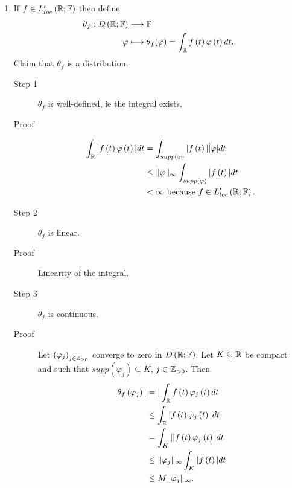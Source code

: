 \begin{example}
\begin{enumerate}
	\item If $f \in  L'_{loc}\left( \mathbb{R}; \mathbb{F} \right) $ then define 
		\begin{align*}
			\theta_{f}: D\left( \mathbb{R};\mathbb{F} \right)  &\longrightarrow \mathbb{F} \\
			\varphi &\longmapsto \theta_{f}(\varphi) = \int_{\mathbb{R}}^{ } f\left( t \right) \varphi\left( t \right) dt 
		.\end{align*}
		Claim that $\theta_{f}$ is a distribution. 
		\begin{description}
			\item[Step 1] $\theta _{f}$ is well-defined, ie the integral exists. 
			\item[Proof] 
				\begin{align*}
					\int_{\mathbb{R}} |f\left( t \right) \varphi\left( t \right) | dt &= \int_{supp\left( \varphi \right) }^{ } |f\left( t \right) | \dot | \varphi | dt  \\
												  &\le \|\varphi\|_{\infty} \int_{supp\left( \varphi \right) }^{ } |f\left( t \right) | dt \\
												  &< \infty\text{ because }f \in  L'_{loc} \left( \mathbb{R}; \mathbb{F} \right) 
				.\end{align*}
			\item[Step 2] $\theta _{f}$ is linear. 
			\item[Proof] Linearity of the integral. 
			\item[Step 3] $\theta _{f}$ is continuous. 
			\item[Proof] Let $\left( \varphi_{j} \right) _{j \in  \mathbb{Z}_{>0}}$ converge to zero in $D\left( \mathbb{R}; \mathbb{F} \right) $. Let $K \subseteq \mathbb{R}$ be compact and such that $supp\left( \varphi_{j} \right) \subseteq K$, $j \in  \mathbb{Z}_{>0}$. Then 
				\begin{align*}
					|\theta_{f}\left( \varphi_{j} \right) | &=  |\int_{\mathbb{R}}^{ } f\left( t \right) \varphi_{j}\left( t \right)  dt  \\
										&\le  \int_{\mathbb{R}}^{ } |f\left( t \right) \varphi_{j} \left( t \right)  | dt \\
										&= \int_{K}^{ } |  |f\left( t \right) \varphi_{j} \left( t \right)  | dt \\
										&\le \|\varphi_{j}\|_{\infty} \int_{K}^{ } |f\left( t \right) | dt\\
										&\le M\|\varphi_{j}\|_{\infty}
				.\end{align*}
		\end{description}

\end{enumerate}
\end{example}
